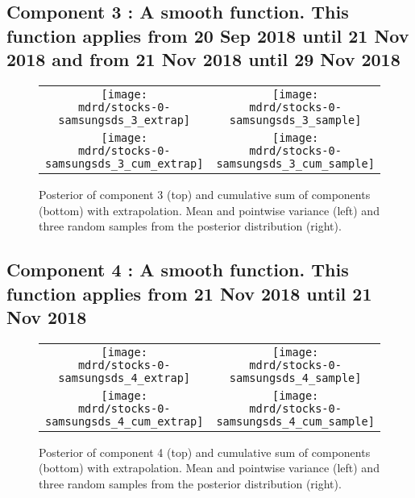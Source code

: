 \documentclass{article} %
\begin{document}
\subsection{Component 3 : A smooth function. This function applies from 20 Sep 2018 until 21 Nov 2018 and from 21 Nov 2018 until 29 Nov 2018}



\begin{figure}[H]
\newcommand{\wmgd}{0.5\columnwidth}
\newcommand{\hmgd}{3.0cm}
\newcommand{\mdrd}{stocks-0-samsungsds}
\newcommand{\mbm}{\hspace{-0.3cm}}
\begin{tabular}{cc}
\mbm \texttt{[image: \\mdrd/stocks-0-samsungsds\_3\_extrap]} & \texttt{[image: \\mdrd/stocks-0-samsungsds\_3\_sample]} \\
\mbm \texttt{[image: \\mdrd/stocks-0-samsungsds\_3\_cum\_extrap]} & \texttt{[image: \\mdrd/stocks-0-samsungsds\_3\_cum\_sample]}
\end{tabular}
\caption{Posterior of component 3 (top) and cumulative sum of components (bottom) with extrapolation. Mean and pointwise variance (left) and three random samples from the posterior distribution (right).}
\label{fig:extrap3}
\end{figure}

\subsection{Component 4 : A smooth function. This function applies from 21 Nov 2018 until 21 Nov 2018}



\begin{figure}[H]
\newcommand{\wmgd}{0.5\columnwidth}
\newcommand{\hmgd}{3.0cm}
\newcommand{\mdrd}{stocks-0-samsungsds}
\newcommand{\mbm}{\hspace{-0.3cm}}
\begin{tabular}{cc}
\mbm \texttt{[image: \\mdrd/stocks-0-samsungsds\_4\_extrap]} & \texttt{[image: \\mdrd/stocks-0-samsungsds\_4\_sample]} \\
\mbm \texttt{[image: \\mdrd/stocks-0-samsungsds\_4\_cum\_extrap]} & \texttt{[image: \\mdrd/stocks-0-samsungsds\_4\_cum\_sample]}
\end{tabular}
\caption{Posterior of component 4 (top) and cumulative sum of components (bottom) with extrapolation. Mean and pointwise variance (left) and three random samples from the posterior distribution (right).}
\label{fig:extrap4}
\end{figure}
\end{document}
